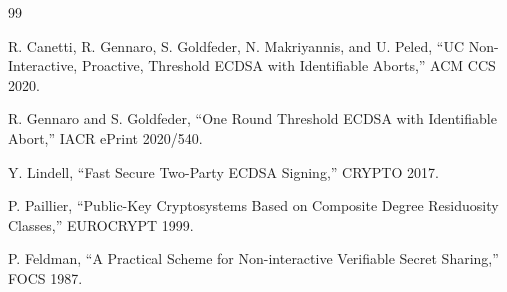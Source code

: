 \documentclass[11pt,a4paper]{article}
\theoremstyle{definition}
\begin{document}

\begin{thebibliography}{99}

R. Canetti, R. Gennaro, S. Goldfeder, N. Makriyannis, and U. Peled, ``UC Non-Interactive, Proactive, Threshold ECDSA with Identifiable Aborts,'' ACM CCS 2020.

R. Gennaro and S. Goldfeder, ``One Round Threshold ECDSA with Identifiable Abort,'' IACR ePrint 2020/540.

Y. Lindell, ``Fast Secure Two-Party ECDSA Signing,'' CRYPTO 2017.

P. Paillier, ``Public-Key Cryptosystems Based on Composite Degree Residuosity Classes,'' EUROCRYPT 1999.

P. Feldman, ``A Practical Scheme for Non-interactive Verifiable Secret Sharing,'' FOCS 1987.

\end{thebibliography}
\end{document}
